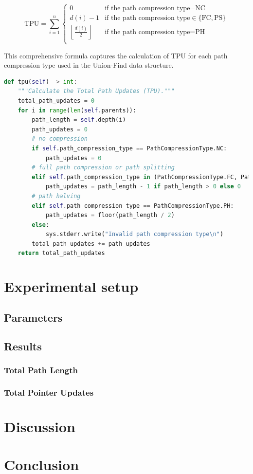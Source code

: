 \documentclass[10pt,a4paper,hidelinks]{article}
\begin{document}
\[
\text{TPU} = \sum_{i=1}^{n} 
\begin{cases} 
0 & \text{if the path compression type} = \text{NC} \\
d(i) - 1 & \text{if the path compression type} \in \{\text{FC}, \text{PS}\} \\
\left\lfloor \frac{d(i)}{2} \right\rfloor & \text{if the path compression type} = \text{PH} \\
\end{cases}
\]

This comprehensive formula captures the calculation of TPU for each path compression type used in the Union-Find data structure.

\begin{lstlisting}[language=Python, caption=Python implementation of TPU for each compression type]
def tpu(self) -> int:
    """Calculate the Total Path Updates (TPU)."""
    total_path_updates = 0
    for i in range(len(self.parents)):
        path_length = self.depth(i)
        path_updates = 0
        # no compression
        if self.path_compression_type == PathCompressionType.NC:
            path_updates = 0
        # full path compression or path splitting
        elif self.path_compression_type in (PathCompressionType.FC, PathCompressionType.PS):
            path_updates = path_length - 1 if path_length > 0 else 0
        # path halving
        elif self.path_compression_type == PathCompressionType.PH:
            path_updates = floor(path_length / 2)
        else:
            sys.stderr.write("Invalid path compression type\n")
        total_path_updates += path_updates
    return total_path_updates
\end{lstlisting}

\section{Experimental setup}
\subsection{Parameters}


\subsection{Results}
\subsubsection{Total Path Length}

\subsubsection{Total Pointer Updates}

\section{Discussion}

\section{Conclusion}


\newpage
\listoffigures
\lstlistoflistings
\listoftables
\end{document}
